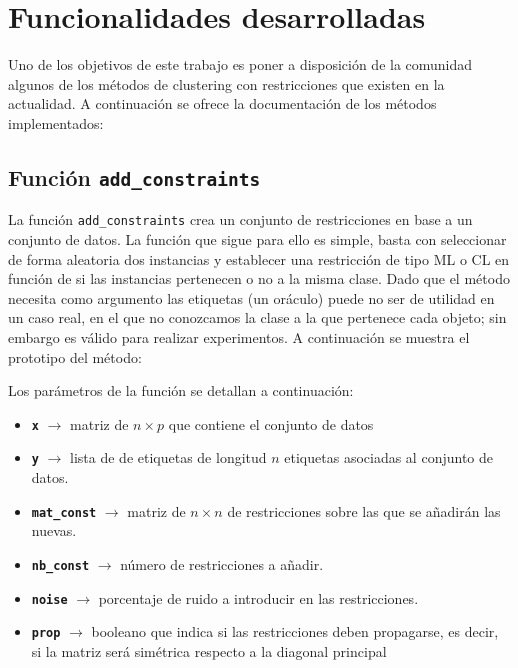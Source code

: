 \section{Funcionalidades desarrolladas}

Uno de los objetivos de este trabajo es poner a disposición de la comunidad algunos de los métodos de clustering con restricciones que existen en la actualidad. A continuación se ofrece la documentación de los métodos implementados:

\subsection{Función \texttt{add\_constraints}}

La función \texttt{add\_constraints} crea un conjunto de restricciones en base a un conjunto de datos. La función que sigue para ello es simple, basta con seleccionar de forma aleatoria dos instancias y establecer una restricción de tipo \acs{ML} o \acs{CL} en función de si las instancias pertenecen o no a la misma clase. Dado que el método necesita como argumento las etiquetas (un oráculo) puede no ser de utilidad en un caso real, en el que no conozcamos la clase a la que pertenece cada objeto; sin embargo es válido para realizar experimentos. A continuación se muestra el prototipo del método:



Los parámetros de la función se detallan a continuación:

\begin{itemize}

	\item \textbf{\texttt{x}} {$\longrightarrow$ matriz de $n \times p$ que contiene el conjunto de datos}
	
	\item \textbf{\texttt{y}} {$\longrightarrow$ lista de de etiquetas de longitud $n$ etiquetas asociadas al conjunto de datos.}
	
	\item \textbf{\texttt{mat\_const}} {$\longrightarrow$ matriz de $n \times n$ de restricciones sobre las que se añadirán las nuevas.}
	
	\item \textbf{\texttt{nb\_const}} {$\longrightarrow$ número de restricciones a añadir.}
	
	\item \textbf{\texttt{noise}} {$\longrightarrow$ porcentaje de ruido a introducir en las restricciones.}
	
	\item \textbf{\texttt{prop}} {$\longrightarrow$ booleano que indica si las restricciones deben propagarse, es decir, si la matriz será simétrica respecto a la diagonal principal}

\end{itemize}

